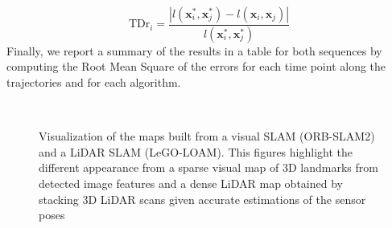 \documentclass[conference]{IEEEtran}  %
\begin{document}
\begin{equation}
    \text{TDr}_i = \frac{|l(\mathbf{x}_i^*, \mathbf{x}_j^*) - l(\mathbf{x}_i, \mathbf{x}_j)|}{l(\mathbf{x}_i^*, \mathbf{x}_j^*)}
\end{equation}
Finally, we report a summary of the results in a table for both sequences by computing the Root Mean Square of the errors for each time point along the trajectories and for each algorithm.
\begin{figure}[tb]
    \centering
         \\
    \caption{Visualization of the maps built from a visual SLAM (ORB-SLAM2) and a LiDAR SLAM (LeGO-LOAM). This figures highlight the different appearance from a sparse visual map of 3D landmarks from detected image features and a dense LiDAR map obtained by stacking 3D LiDAR scans given accurate estimations of the sensor poses}
    \label{fig::map_comparison}
\end{figure}
\end{document}
